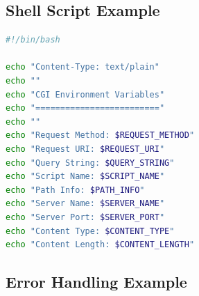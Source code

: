 \documentclass[11pt,a4paper]{article}
\begin{document}
\subsection{Shell Script Example}

\begin{lstlisting}[language=bash, caption=Environment Display Script]
#!/bin/bash

echo "Content-Type: text/plain"
echo ""
echo "CGI Environment Variables"
echo "========================="
echo ""
echo "Request Method: $REQUEST_METHOD"
echo "Request URI: $REQUEST_URI"
echo "Query String: $QUERY_STRING"
echo "Script Name: $SCRIPT_NAME"
echo "Path Info: $PATH_INFO"
echo "Server Name: $SERVER_NAME"
echo "Server Port: $SERVER_PORT"
echo "Content Type: $CONTENT_TYPE"
echo "Content Length: $CONTENT_LENGTH"
\end{lstlisting}

\subsection{Error Handling Example}
\end{document}

